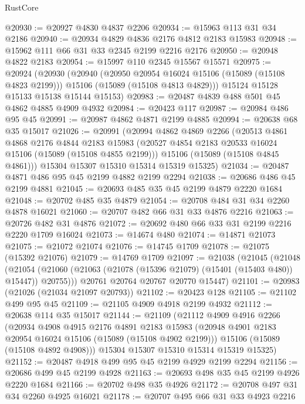 \begin{lexlean}{RustCore}
\begin{coremodule}
@20930 := @20927 @4830 @4837 @2206
@20934 := @15963 @113 @31 @34 @2186
@20940 := @20934 @4829 @4836 @2176 @4812 @2183 @15983
@20948 := @15962 @111 @66 @31 @33 @2345 @2199 @2216 @2176
@20950 := @20948 @4822 @2183
@20954 := @15997 @110 @2345 @15567 @15571
@20975 := @20924
    (@20930
      (@20940
        (@20950 @20954 @16024 @15106 (@15089 (@15108 @4823 @2199)))
        @15106
        (@15089 (@15108 @4813 @4829)))
      @15124
      @15128
      @15133
      @15138
      @15144
      @15153)
@20983 := @20487 @4839 @488 @501 @45 @4862 @4885 @4909 @4932
@20984 := @20423 @117
@20987 := @20984 @486 @95 @45
@20991 := @20987 @4862 @4871 @2199 @4885
@20994 := @20638 @68 @35 @15017
@21026 := @20991
    (@20994
      @4862
      @4869
      @2266
      (@20513
        @4861
        @4868
        @2176
        @4844
        @2183
        @15983
        (@20527 @4854 @2183 @20533 @16024 @15106 (@15089 (@15108 @4855 @2199)))
        @15106
        (@15089 (@15108 @4845 @4861)))
      @15304
      @15307
      @15310
      @15314
      @15319
      @15325)
@21034 := @20487 @4871 @486 @95 @45 @2199 @4882 @2199 @2294
@21038 := @20686 @486 @45 @2199 @4881
@21045 := @20693 @485 @35 @45 @2199 @4879 @2220 @1684
@21048 := @20702 @485 @35 @4879
@21054 := @20708 @484 @31 @34 @2260 @4878 @16021
@21060 := @20707 @482 @66 @31 @33 @4876 @2216
@21063 := @20726 @482 @31 @4876
@21072 := @20692 @480 @66 @33 @31 @2199 @2216 @2220 @1709 @16024
@21073 := @14674 @480
@21074 := @14871 @21073
@21075 := @21072 @21074
@21076 := @14745 @1709
@21078 := @21075 (@15392 @21076)
@21079 := @14769 @1709
@21097 := @21038
    (@21045
      (@21048
        (@21054 (@21060 (@21063 (@21078 (@15396 @21079) (@15401 (@15403 @480)) @15447)) @20755)))
      @20761
      @20764
      @20767
      @20770
      @15447)
@21101 := @20983 (@21026 (@21034 @21097 @20793))
@21102 := @20423 @128
@21105 := @21102 @499 @95 @45
@21109 := @21105 @4909 @4918 @2199 @4932
@21112 := @20638 @114 @35 @15017
@21144 := @21109
    (@21112
      @4909
      @4916
      @2266
      (@20934
        @4908
        @4915
        @2176
        @4891
        @2183
        @15983
        (@20948 @4901 @2183 @20954 @16024 @15106 (@15089 (@15108 @4902 @2199)))
        @15106
        (@15089 (@15108 @4892 @4908)))
      @15304
      @15307
      @15310
      @15314
      @15319
      @15325)
@21152 := @20487 @4918 @499 @95 @45 @2199 @4929 @2199 @2294
@21156 := @20686 @499 @45 @2199 @4928
@21163 := @20693 @498 @35 @45 @2199 @4926 @2220 @1684
@21166 := @20702 @498 @35 @4926
@21172 := @20708 @497 @31 @34 @2260 @4925 @16021
@21178 := @20707 @495 @66 @31 @33 @4923 @2216

\end{coremodule}
\end{lexlean}
